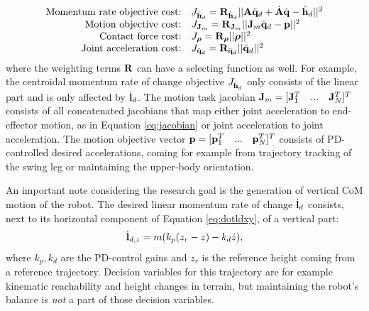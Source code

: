 \begin{equation*}
\begin{array}{rlcl}
$Momentum rate objective cost:$ & J_{\dot{\vect{h}}_d}= \wght_{\dot{\vect{h}}_d}||\matr{A}\ddqjntd + \dot{\matr{A}}\dqjnt - \dot{\vect{h}}_d||^2\\
$Motion objective cost:$ & J_{\matr{J}_m} = \wght_{\matr{J}_m}||\matr{J}_m\ddqjntd-\vect{p}||^2\\
$Contact force cost:$ & J_{\bs{\rho}}=\wght_{\bs{\rho}}||\bs{\rho}||^2 \\
$Joint acceleration cost:$ & J_{\ddqjntd} = \wght_{\ddqjntd}||\ddqjntd ||^2 \\
\end{array}
\end{equation*}
where the weighting terms $\mathbf{R}$ can have a selecting function as well. For example, the centroidal momentum rate of change objective $J_{\dot{\mathbf{h}}_d}$ only consists of the linear part and is only affected by $\dot{\mathbf{l}}_d$. The motion task jacobian $\mathbf{J}_m = [\mathbf{J}_1^T\quad...\quad\mathbf{J}_N^T]^T$ consists of all concatenated jacobians that map either joint acceleration to end-effector motion, as in Equation \eqref{eq:jacobian} or joint acceleration to joint acceleration. The motion objective vector $\mathbf{p} = [\mathbf{p}_1^T\quad...\quad\mathbf{p}_N^T]^T$  consists of PD-controlled desired accelerations, coming for example from trajectory tracking of the swing leg or maintaining the upper-body orientation. %

An important note considering the research goal is the generation of vertical \ac{CoM} motion of the robot. The desired linear momentum rate of change $\dot{\mathbf{l}}_d$ consists, next to its horizontal component of Equation \eqref{eq:dotldxy}, of a vertical part:
\begin{equation}
\dot{\mathbf{l}}_{d,z} =m(k_p(z_r-z) - k_d\dot{z}), 
\label{eq:defaultheightcontrol}
\end{equation}
where $k_p, k_d$ are the PD-control gains and $z_r$ is the reference height coming from a reference trajectory. Decision variables for this trajectory are for example kinematic reachability and height changes in terrain, but maintaining the robot's balance is \textit{not} a part of those decision variables.


